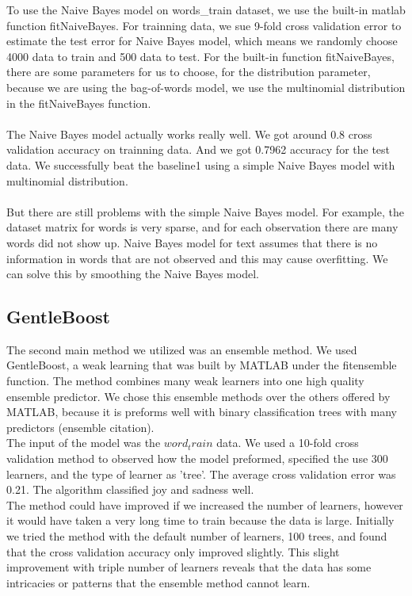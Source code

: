 \documentclass[]{article}
\begin{document}
To use the Naive Bayes model on words\_train dataset, we use the built-in matlab function fitNaiveBayes. For trainning data, we sue 9-fold cross validation error to estimate the test error for Naive Bayes model, which means we randomly choose 4000 data to train and 500 data to test. For the built-in function fitNaiveBayes, there are some parameters for us to choose, for the distribution parameter, because we are using the bag-of-words model, we use the multinomial distribution in the fitNaiveBayes function. \\\\

The Naive Bayes model actually works really well. We got around 0.8 cross validation accuracy on trainning data. And we got 0.7962 accuracy for the test data. We successfully beat the baseline1 using a simple Naive Bayes model with multinomial distribution. \\\\

But there are still problems with the simple Naive Bayes model. For example, the dataset matrix for words is very sparse, and for each observation there are many  words did not show up. Naive Bayes model for text assumes that there is no information in words that are not observed and this may cause overfitting. We can solve this by smoothing the Naive Bayes model.

\subsection{GentleBoost}

The second main method we utilized was an ensemble method. We used GentleBoost, a weak learning that was built by MATLAB under the fitensemble function. The method combines many weak learners into one high quality ensemble predictor. We chose this ensemble methods over the others offered by MATLAB, because it is preforms well with binary classification trees with many predictors (ensemble citation). \\

The input of the model was the $word_train$ data. We used a 10-fold cross validation method to observed how the model preformed, specified the use 300 learners, and the type of learner as 'tree'. The average cross validation error was 0.21. The algorithm classified joy and sadness well. \\

The method could have improved if we increased the number of learners, however it would have taken a very long time to train because the data is large. Initially we tried the method with the default number of learners, 100 trees, and found that the cross validation accuracy only improved slightly. This slight improvement with triple number of learners reveals that the data has some intricacies or patterns that the ensemble method cannot learn.   
\end{document}
